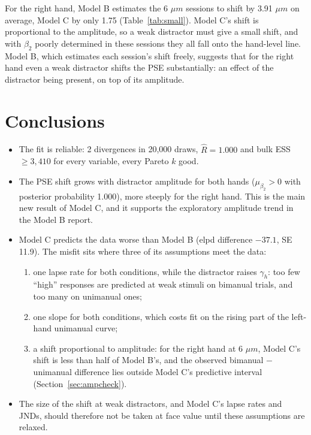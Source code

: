 \documentclass[11pt]{article}
\begin{document}
For the right hand, Model B estimates the 6 $\mu m$ sessions to shift by 3.91 $\mu m$ on
average, Model C by only 1.75 (Table~\ref{tab:small}). Model C's shift is proportional
to the amplitude, so a weak distractor must give a small shift, and with $\beta_2$
poorly determined in these sessions they all fall onto the hand-level line. Model B,
which estimates each session's shift freely, suggests that for the right hand even a
weak distractor shifts the PSE substantially: an effect of the distractor being
present, on top of its amplitude.

\section{Conclusions}
\label{sec:conclusions}

\begin{itemize}
  \item The fit is reliable: 2 divergences in 20{,}000 draws, $\hat{R} = 1.000$ and
        bulk ESS $\ge 3{,}410$ for every variable, every Pareto $k$ good.
  \item The PSE shift grows with distractor amplitude for both hands
        ($\mu_{\beta_2} > 0$ with posterior probability 1.000), more steeply for the
        right hand. This is the main new result of Model C, and it supports the
        exploratory amplitude trend in the Model B report.
  \item Model C predicts the data worse than Model B (elpd difference $-37.1$,
        SE 11.9). The misfit sits where three of its assumptions meet the data:
        \begin{enumerate}
          \item one lapse rate for both conditions, while the distractor raises
                $\gamma_h$: too few ``high'' responses are predicted at weak stimuli on
                bimanual trials, and too many on unimanual ones;
          \item one slope for both conditions, which costs fit on the rising part of
                the left-hand unimanual curve;
          \item a shift proportional to amplitude: for the right hand at 6 $\mu m$,
                Model C's shift is less than half of Model B's, and the observed
                bimanual $-$ unimanual difference lies outside Model C's predictive
                interval (Section~\ref{sec:ampcheck}).
        \end{enumerate}
  \item The size of the shift at weak distractors, and Model C's lapse rates and JNDs,
        should therefore not be taken at face value until these assumptions are
        relaxed.
\end{itemize}
\end{document}
